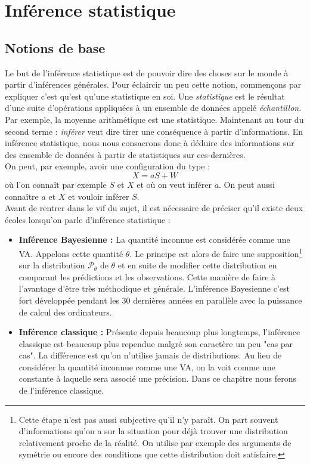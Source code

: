 \documentclass[a4paper,12pt]{report}
\theoremstyle{definition}
\renewcommand{\(}{\left(}
\renewcommand{\)}{\right)}
\renewcommand{\b}{\textbf}
\renewcommand{\P}{\mathcal{P}}
\renewcommand{\d}{\textit}
\begin{document}
\chapter{Inférence statistique}

    \section{Notions de base}
    
        Le but de l'inférence statistique est de pouvoir dire des choses sur le monde à partir d'inférences générales. Pour éclaircir un peu cette notion, commençons par expliquer c'est qu'est qu'une statistique en soi. Une \d{statistique} est le résultat d'une suite d'opérations appliquées à un ensemble de données appelé \d{échantillon}. Par exemple, la moyenne arithmétique est une statistique. Maintenant au tour du second terme : \d{inférer} veut dire tirer une conséquence à partir d'informations. En inférence statistique, nous nous consacrons donc à déduire des informations sur des ensemble de données à partir de statistiques sur ces-dernières.\\
        
        On peut, par exemple, avoir une configuration du type :
        $$X = aS+W$$
        où l'on connaît par exemple $S$ et $X$ et où on veut inférer $a$. On peut aussi connaître $a$ et $X$ et vouloir inférer $S$.\\
        
        Avant de rentrer dans le vif du sujet, il est nécessaire de préciser qu'il existe deux écoles lorsqu'on parle d'inférence statistique :
        \begin{itemize}[label = \textbullet]
            \item \b{Inférence Bayesienne :} La quantité inconnue est considérée comme une VA. Appelons cette quantité $\theta$. Le principe est alors de faire une supposition\footnote{Cette étape n'est pas aussi subjective qu'il n'y paraît. On part souvent d'informations qu'on a sur la situation pour déjà trouver une distribution relativement proche de la réalité. On utilise par exemple des arguments de symétrie ou encore des conditions que cette distribution doit satisfaire.} sur la distribution $\P_{\theta}$ de $\theta$ et en suite de modifier cette distribution en comparant les prédictions et les observations. Cette manière de faire à l'avantage d'être très méthodique et générale. L'inférence Bayesienne c'est fort développée pendant les 30 dernières années en parallèle avec la puissance de calcul des ordinateurs.
            
            \item \b{Inférence classique :} Présente depuis beaucoup plus longtemps, l'inférence classique est beaucoup plus rependue malgré son caractère un peu "cas par cas". La différence est qu'on n'utilise jamais de distributions. Au lieu de considérer la quantité inconnue comme une VA, on la voit comme une constante à laquelle sera associé une précision. Dans ce chapitre nous ferons de l'inférence classique.
        \end{itemize}
        
\end{document}
